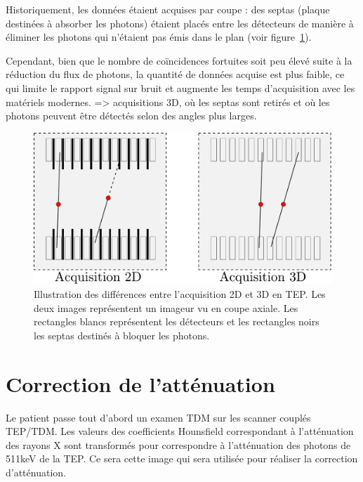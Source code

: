 Historiquement, les données étaient acquises par coupe : des septas (plaque destinées à absorber les photons) étaient placés entre les détecteurs de manière à éliminer les photons qui n'étaient pas émis dans le plan (voir figure~\ref{fig:2D3D}). 

Cependant, bien que le nombre de coïncidences fortuites soit peu élevé suite à la réduction du flux de photons, la quantité de données acquise est plus faible, ce qui limite le rapport signal sur bruit et augmente les temps d'acquisition avec les matériels modernes. => acquisitions 3D, où les septas sont retirés et où les photons peuvent être détectés selon des angles plus larges.


\begin{figure}
\centering
\includegraphics[width=12cm]{images/2D3D}
\caption[Acquisitions 2D et 3D en TEP]{Illustration des différences entre l'acquisition 2D et 3D en TEP. Les deux images représentent un imageur vu en coupe axiale. Les rectangles blancs représentent les détecteurs et les rectangles noirs les septas destinés à bloquer les photons. }
\label{fig:2D3D}
\end{figure}


	\section{Correction de l'atténuation}

\label{CorrectionAttenuation}

Le patient passe tout d'abord un examen TDM sur les scanner couplés TEP/TDM. Les valeurs des coefficients Hounsfield correspondant à l'atténuation des rayons X sont transformés pour correspondre à l'atténuation des photons de 511keV de la TEP. Ce sera cette image qui sera utilisée pour réaliser la correction d'atténuation. 

